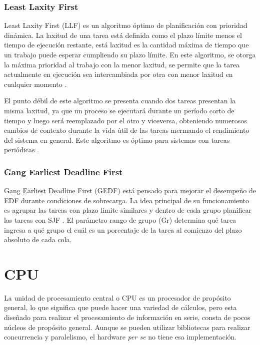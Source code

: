 \subsubsection{Least Laxity First}
Least Laxity First (LLF) es un algoritmo óptimo de planificación con prioridad dinámica. La laxitud de una tarea está definida como el plazo límite menos el tiempo de ejecución restante, está laxitud es la cantidad máxima de tiempo que un trabajo puede esperar cumpliendo su plazo límite. En este algoritmo, se otorga la máxima prioridad al trabajo con la menor laxitud, se permite que la tarea actualmente en ejecución sea intercambiada por otra con menor laxitud en cualquier momento \cite{NPr}.
  
  \vspace{0.3cm}
  
  El punto débil de este algoritmo se presenta cuando dos tareas presentan la misma laxitud, ya que un proceso se ejecutará durante un período corto de tiempo y luego será reemplazado por el otro y viceversa, obteniendo numerosos cambios de \gls{contexto} durante la vida útil de las tareas mermando el rendimiento del sistema en general. Este algoritmo es óptimo para sistemas con tareas periódicas \cite{ComRTT}.
  
\subsubsection{Gang Earliest Deadline First}
Gang Earliest Deadline First (GEDF) está pensado para mejorar el desempeño de EDF durante condiciones de sobrecarga\cite{GEDF}. La idea principal de su funcionamiento es agrupar las tareas con plazo límite similares y dentro de cada grupo planificar las tareas con SJF \cite{ComRTT}. El parámetro rango de grupo (Gr) determina qué tarea ingresa a qué grupo el cuál es un porcentaje de la tarea al comienzo del plazo absoluto de cada cola.


        \section{CPU}
    La unidad de procesamiento central o \acrshort{CPU} es un procesador de propósito general, lo que significa que puede hacer una variedad de cálculos, pero esta diseñado para realizar el procesamiento de información en serie, consta de pocos núcleos de propósito general. Aunque se pueden utilizar bibliotecas para realizar concurrencia y paralelismo, el hardware \textit{per se} no tiene esa implementación.

